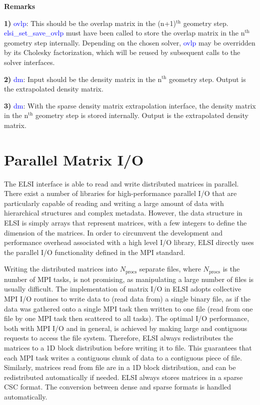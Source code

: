 \documentclass{report}
\newcommand{\tcb}[1]{\textcolor{blue}{#1}}
\begin{document}
\textbf{Remarks}

\textbf{1)} \tcb{ovlp}: This should be the overlap matrix in the (n+1)$^\text{th}$ geometry step. \tcb{elsi\_set\_save\_ovlp} must have been called to store the overlap matrix in the n$^\text{th}$ geometry step internally. Depending on the chosen solver, \tcb{ovlp} may be overridden by its Cholesky factorization, which will be reused by subsequent calls to the solver interfaces.

\textbf{2)} \tcb{dm}: Input should be the density matrix in the n$^\text{th}$ geometry step. Output is the extrapolated density matrix.

\textbf{3)} \tcb{dm}: With the sparse density matrix extrapolation interface, the density matrix in the n$^\text{th}$ geometry step is stored internally. Output is the extrapolated density matrix.

\section{Parallel Matrix I/O}
\label{sec:rw}
The ELSI interface is able to read and write distributed matrices in parallel. There exist a number of libraries for high-performance parallel I/O that are particularly capable of reading and writing a large amount of data with hierarchical structures and complex metadata. However, the data structure in ELSI is simply arrays that represent matrices, with a few integers to define the dimension of the matrices. In order to circumvent the development and performance overhead associated with a high level I/O library, ELSI directly uses the parallel I/O functionality defined in the MPI standard.

Writing the distributed matrices into $N_\text{procs}$ separate files, where $N_\text{procs}$ is the number of MPI tasks, is not promising, as manipulating a large number of files is usually difficult. The implementation of matrix I/O in ELSI adopts collective MPI I/O routines to write data to (read data from) a single binary file, as if the data was gathered onto a single MPI task then written to one file (read from one file by one MPI task then scattered to all tasks). The optimal I/O performance, both with MPI I/O and in general, is achieved by making large and contiguous requests to access the file system. Therefore, ELSI always redistributes the matrices to a 1D block distribution before writing it to file. This guarantees that each MPI task writes a contiguous chunk of data to a contiguous piece of file. Similarly, matrices read from file are in a 1D block distribution, and can be redistributed automatically if needed. ELSI always stores matrices in a sparse CSC format. The conversion between dense and sparse formats is handled automatically.
\end{document}
